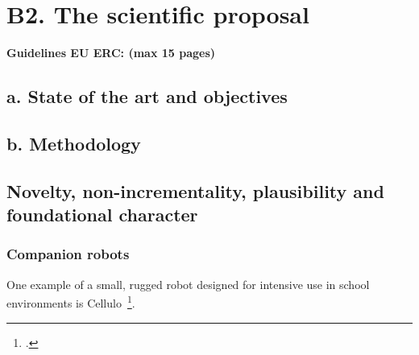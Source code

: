 \documentclass[]{article}
\newcommand{\eu}[1]{{\color{teal}\textbf{Guidelines EU ERC: #1}}}
\begin{document}
\newpage

\section{B2. The scientific proposal}\label{part-b2-the-scientific-proposal}

\eu{(max 15 pages)}

\hypertarget{a.-state-of-the-art-and-objectives}{%
\subsection{a. State of the art and
objectives}\label{a.-state-of-the-art-and-objectives}}

\hypertarget{b.-methodology}{%
\subsection{b. Methodology}\label{b.-methodology}}

\subsection{Novelty, non-incrementality, plausibility and foundational character}

\subsubsection{Companion robots}

One example of a small, rugged robot designed for intensive use in school
environments is Cellulo~\footcite{ozgur2017cellulo}.
\end{document}
